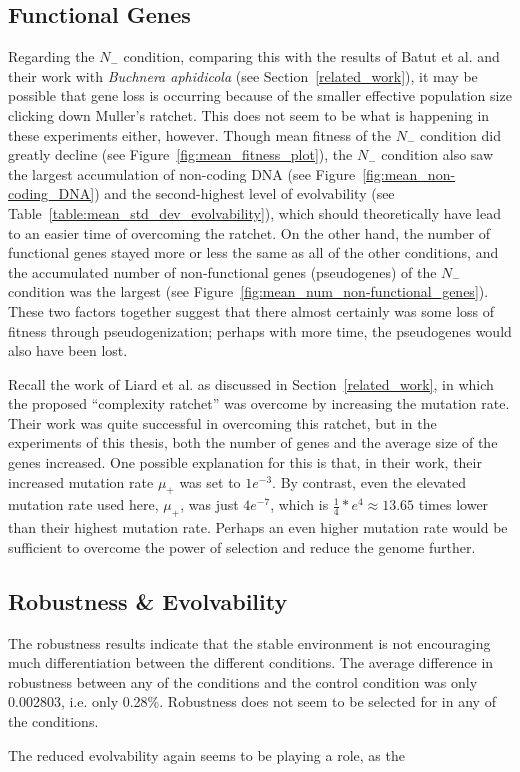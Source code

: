 \subsection{Functional Genes}
Regarding the $N_-$ condition, comparing this with the results of Batut et al. and their work with \textit{Buchnera aphidicola} (see Section~\ref{related_work}), it may be possible that gene loss is occurring because of the smaller effective population size clicking down Muller's ratchet. This does not seem to be what is happening in these experiments either, however. Though mean fitness of the $N_-$ condition did greatly decline (see Figure~\ref{fig:mean_fitness_plot}), the $N_-$ condition also saw the largest accumulation of non-coding DNA (see Figure~\ref{fig:mean_non-coding_DNA}) and the second-highest level of evolvability (see Table~\ref{table:mean_std_dev_evolvability}), which should theoretically have lead to an easier time of overcoming the ratchet. On the other hand, the number of functional genes stayed more or less the same as all of the other conditions, and the accumulated number of non-functional genes (pseudogenes) of the $N_-$ condition was the largest (see Figure~\ref{fig:mean_num_non-functional_genes}). These two factors together suggest that there almost certainly was some loss of fitness through pseudogenization; perhaps with more time, the pseudogenes would also have been lost.

Recall the work of Liard et al.\cite{Liard.2018} as discussed in Section~\ref{related_work}, in which the proposed ``complexity ratchet'' was overcome by increasing the mutation rate. Their work was quite successful in overcoming this ratchet, but in the experiments of this thesis, both the number of genes and the average size of the genes increased. One possible explanation for this is that, in their work, their increased mutation rate $\mu_+$ was set to $1e^{-3}$.  By contrast, even the elevated mutation rate used here, $\mu_+$, was just $4e^{-7}$, which is $\frac{1}{4}*e^4 \approx 13.65$ times lower than their highest mutation rate. Perhaps an even higher mutation rate would be sufficient to overcome the power of selection and reduce the genome further. 

\subsection{Robustness \& Evolvability}
The robustness results indicate that the stable environment is not encouraging much differentiation between the different conditions.  The average difference in robustness between any of the conditions and the control condition was only 0.002803, i.e. only 0.28\%. Robustness does not seem to be selected for in any of the conditions. 

The reduced evolvability again seems to be playing a role, as the 


